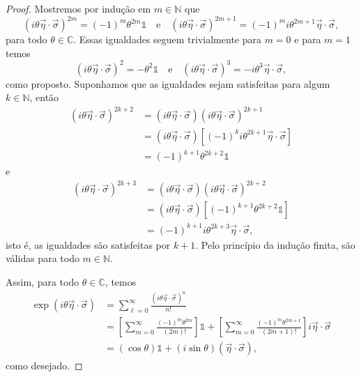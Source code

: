 \begin{proof}
    Mostremos por indução em \(m \in \mathbb{N}\) que
    \begin{equation*}
        (i\theta\vec \eta \cdot \vec \sigma)^{2m} = (-1)^m\theta^{2m}\mathds{1}\quad\text{e}\quad(i\theta\vec \eta \cdot \vec \sigma)^{2m+1} = (-1)^{m}i\theta^{2m+1}\vec \eta \cdot \vec \sigma,
    \end{equation*}
    para todo \(\theta \in \mathbb{C}\). Essas igualdades seguem trivialmente para \(m = 0\) e para \(m = 1\) temos
    \begin{equation*}
        (i\theta \vec \eta\cdot \vec \sigma)^2 = - \theta^2 \mathds{1}\quad\text{e}\quad(i\theta\vec\eta\cdot\vec\sigma)^3 = -i\theta^3 \vec \eta \cdot \vec \sigma,
    \end{equation*}
    como proposto. Suponhamos que as igualdades sejam satisfeitas para algum \(k \in \mathbb{N}\), então
    \begin{align*}
        (i\theta\vec \eta \cdot \vec \sigma)^{2k+2} &= (i\theta\vec \eta \cdot \vec \sigma)(i\theta\vec \eta \cdot \vec \sigma)^{2k+1}\\
                                                    &= (i\theta\vec \eta \cdot \vec \sigma)\left[(-1)^ki\theta^{2k+1}\vec \eta\cdot \vec \sigma\right]\\
                                                    &= (-1)^{k+1}\theta^{2k+2} \mathds{1}
    \end{align*}
    e
    \begin{align*}
        (i\theta\vec \eta \cdot \vec \sigma)^{2k+3} &= (i\theta\vec \eta \cdot \vec \sigma)(i\theta\vec \eta \cdot \vec \sigma)^{2k+2}\\
                                                    &= (i\theta\vec \eta \cdot \vec \sigma)\left[(-1)^{k+1}\theta^{2k+2} \mathds{1}\right]\\
                                                    &= (-1)^{k+1}i\theta^{2k+3}\vec \eta \cdot \vec \sigma,
    \end{align*}
    isto é, as igualdades são satisfeitas por \(k + 1\). Pelo princípio da indução finita, são válidas para todo \(m \in \mathbb{N}\).

    Assim, para todo \(\theta \in \mathbb{C}\), temos
    \begin{align*}
        \exp(i\theta \vec \eta \cdot \vec \sigma) &= \sum_{\ell = 0}^{\infty} \frac{(i \theta \vec \eta \cdot \vec \sigma)^n}{n!}\\
                                                  &= \left[\sum_{m = 0}^{\infty} \frac{(-1)^{m}\theta^{2m}}{(2m)!}\right] \mathds{1} + \left[\sum_{m=0}^\infty\frac{(-1)^m \theta^{2m+1}}{(2m+1)!}\right] i \vec \eta \cdot \vec \sigma\\
                                                  &= (\cos\theta)\mathds{1} + (i\sin\theta)(\vec \eta \cdot \vec \sigma),
    \end{align*}
    como desejado.
\end{proof}

